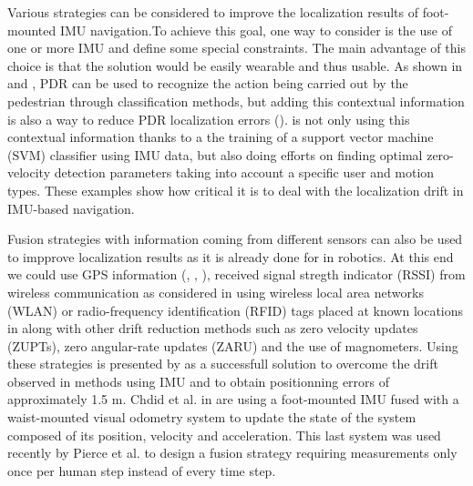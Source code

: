 Various strategies can be considered to improve the localization results of foot-mounted IMU navigation.To achieve this goal, one way to consider is the use of one or more IMU and define some special constraints.
The main advantage of this choice is that the solution would be easily wearable and thus usable.
As shown in \cite{kourogi2010method} and \cite{panahandeh2012chest}, PDR can be used to recognize the action being carried out by the pedestrian through classification methods, but adding this contextual 
information is also a way to reduce PDR localization errors (\cite{kourogi2010method}). \cite{wagstaff2017improving} is not only using this contextual information 
thanks to a the training of a support vector machine (SVM) classifier using IMU data, but also doing efforts on finding optimal zero-velocity detection parameters taking into account 
a specific user and motion types. These examples show how critical it is to deal with the localization drift in IMU-based navigation. 

Fusion strategies with information coming from different sensors can also be used to impprove localization results as it is already done
for in robotics. At this end we could use GPS information (\cite{sukkarieh1999high}, \cite{hide2012investigating}, \cite{gao2014data}), received signal stregth indicator (RSSI) from wireless communication as considered
in \cite{malyavej2013indoor} using wireless local area networks (WLAN) or radio-frequency identification (RFID) tags placed at known locations in \cite{ruiz2012accurate}
along with other drift reduction methods such as zero velocity updates (ZUPTs), zero angular-rate updates (ZARU) and the use of magnometers.
Using these strategies is presented by \cite{ruiz2012accurate} as a successfull solution to overcome the drift observed in methods using IMU and to obtain positionning errors of approximately 1.5 m.
Chdid et al. in \cite{chdid2011inertial} are using a foot-mounted IMU fused with a waist-mounted visual odometry system to update the state of the system composed of its position, velocity and acceleration.
This last system was used recently by Pierce et al. \cite{pierce2016incorporation} to design a fusion strategy requiring measurements only once per human step instead of every time step.




